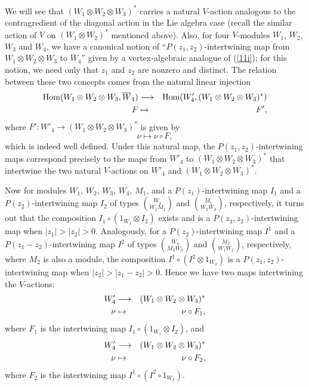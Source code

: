 \documentclass[12pt]{article}
\begin{document}
We will see that $(W_1\otimes W_2 \otimes W_3)^*$ carries a natural
$V$-action analogous to the contragredient of the diagonal action in
the Lie algebra case (recall the similar action of $V$ on $(W_1\otimes
W_2)^*$ mentioned above).  Also, for four $V$-modules $W_1$, $W_2$,
$W_3$ and $W_4$, we have a canonical notion of ``$P(z_1,
z_2)$-intertwining map {}from $W_1 \otimes W_2 \otimes W_3$ to
$\overline{W}_4$'' given by a vertex-algebraic analogue of
(\ref{11i}); for this notion, we need only that $z_1$ and $z_2$ are
nonzero and distinct. The relation between these two concepts comes
{}from the natural linear injection
\begin{eqnarray}
{\rm Hom} (W_1\otimes W_2\otimes W_3, \overline{W}_4) &\longrightarrow &
{\rm Hom} (W'_4, (W_1\otimes W_2\otimes W_3)^*)\nonumber\\ F&\mapsto & F',
\end{eqnarray}
where $F': W'_4\longrightarrow (W_1\otimes W_2\otimes W_3)^*$ is given
by
\begin{equation}\label{F'}
\nu\mapsto \nu\circ F,
\end{equation}
which is indeed well defined.  Under this natural map, the
$P(z_1,z_2)$-intertwining maps correspond precisely to the maps {}from
$W'_4$ to $(W_1\otimes W_2\otimes W_3)^*$ that intertwine the two
natural $V$-actions on $W'_4$ and $(W_1\otimes W_2\otimes W_3)^*$.

Now for modules $W_1$, $W_2$, $W_3$, $W_4$, $M_1$, and a
$P(z_1)$-intertwining map $I_1$ and a $P(z_2)$-intertwining map $I_2$
of types ${W_4 \choose {W_1 M_1}}$ and ${M_1 \choose {W_2 W_3}}$,
respectively, it turns out that the composition $I_1\circ
(1_{W_1}\otimes I_2)$ exists and is a $P(z_1, z_2)$-intertwining map
when $|z_1|>|z_2|>0$.  Analogously, for a $P(z_2)$-intertwining map
$I^1$ and a $P(z_1-z_2)$-intertwining map $I^2$ of types ${W_4 \choose
{M_2 W_3}}$ and ${M_2 \choose {W_1 W_2}}$, respectively, where $M_2$
is also a module, the composition $I^1\circ (I^2\otimes 1_{W_3})$ is a
$P(z_1, z_2)$-intertwining map when $|z_2|>|z_1-z_2|>0$.  Hence we
have two maps intertwining the $V$-actions:
\begin{eqnarray}
W'_4 &\longrightarrow &(W_1\otimes W_2\otimes
W_3)^*\nonumber\\
\nu&\mapsto &\nu\circ F_1,
\label{iiv1}
\end{eqnarray}
where $F_1$ is the intertwining map $I_1\circ (1_{W_1}\otimes I_2)$,
and
\begin{eqnarray}
W'_4 &\longrightarrow & (W_1\otimes W_2\otimes
W_3)^*\nonumber\\
\nu&\mapsto &\nu\circ F_2,
\label{iiv2}
\end{eqnarray}
where $F_2$ is the intertwining map $I^1\circ (I^2\circ 1_{W_3})$.
\end{document}
